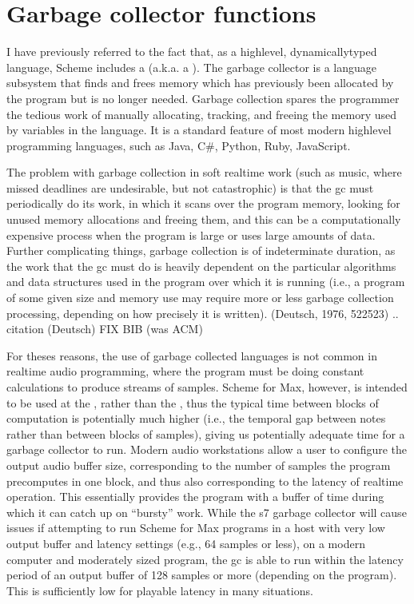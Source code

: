 \documentclass[letterpaper,10pt,english]{sphinxmanual}
\begin{document}
\section{Garbage collector functions}
\label{\detokenize{features_usage:garbage-collector-functions}}
\sphinxAtStartPar
I have previously referred to the fact that, as a high\sphinxhyphen{}level, dynamically\sphinxhyphen{}typed language, Scheme includes a
 (a.k.a. a ).
The garbage collector is a language subsystem that finds and
frees memory which has previously been allocated by the program but is no longer needed.
Garbage collection spares the programmer the tedious work of manually allocating,
tracking, and freeing the memory used by variables in the language.
It is a standard feature of most modern high\sphinxhyphen{}level programming languages,
such as Java, C\#, Python, Ruby, JavaScript.

\sphinxAtStartPar
The problem with garbage collection in soft real\sphinxhyphen{}time
work (such as music, where missed deadlines are undesirable, but not catastrophic)
is that the gc must periodically do its work, in which it scans over the program
memory, looking for unused memory allocations and freeing them, and
this can be a computationally expensive process when the program is large or
uses large amounts of data.
Further complicating things, garbage collection is of indeterminate duration,
as the work that the gc must do is heavily dependent on the particular algorithms
and data structures used in the program over which it is running
(i.e., a program of some given size and memory use may require more or less
garbage collection processing, depending on how precisely it is written). (Deutsch, 1976, 522\sphinxhyphen{}523)
.. citation (Deutsch) FIX BIB (was ACM)

\sphinxAtStartPar
For theses reasons, the use of garbage\sphinxhyphen{} collected languages is not common
in real\sphinxhyphen{}time audio programming, where the program must be doing constant calculations
to produce streams of samples.
Scheme for Max, however, is intended to be used at the ,
rather than the , thus the typical time between blocks of computation
is potentially much higher (i.e., the temporal gap between notes rather than between blocks of samples),
giving us potentially adequate time for a garbage collector to run.
Modern audio workstations allow a user to configure the output audio buffer size,
corresponding to the number of samples the program pre\sphinxhyphen{}computes in one block, and thus
also corresponding to the latency of real\sphinxhyphen{}time operation.
This essentially provides the program with a buffer of time during which it can catch up
on “bursty” work.
While the s7 garbage collector will cause issues if attempting to run
Scheme for Max programs in a host with very low output buffer and latency settings (e.g.,
64 samples or less), on a modern computer and moderately sized program,
the gc is able to run within the latency period of an output buffer of 128 samples
or more (depending on the program). This is sufficiently low for playable latency
in many situations.
\end{document}

